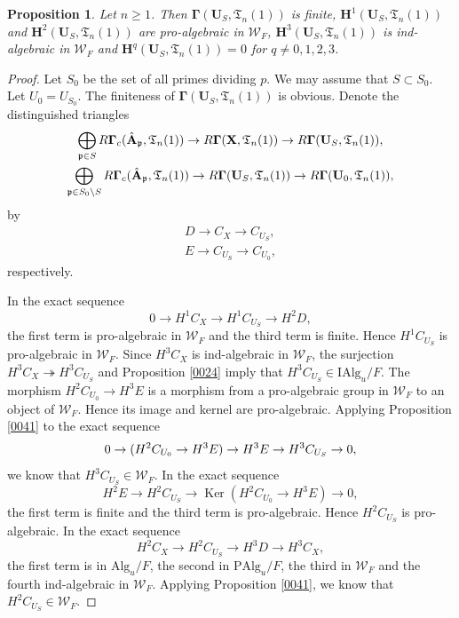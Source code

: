 \documentclass{amsart}
\newtheorem{Prop}[Thm]{Proposition}
\theoremstyle{remark}
\numberwithin{equation}{section}
\newcommand{\onto}{\twoheadrightarrow}
\newcommand{\Alg}{\mathrm{Alg}}
\newcommand{\Ind}{\mathrm{I}}
\newcommand{\Pro}{\mathrm{P}}
\newcommand{\alg}[1]{\mathbf{#1}}
\newcommand{\ideal}[1]{\mathfrak{#1}}
\DeclareMathOperator{\Ker}{Ker}
\let\Im\relax
\DeclareMathOperator{\Im}{Im}
\begin{document}
\begin{Prop} \label{0052}
	Let $n \ge 1$.
	Then $\alg{\Gamma}(\alg{U}_{S}, \mathfrak{T}_{n}(1))$ is finite,
	$\alg{H}^{1}(\alg{U}_{S}, \mathfrak{T}_{n}(1))$ and
	$\alg{H}^{2}(\alg{U}_{S}, \mathfrak{T}_{n}(1))$ are pro-algebraic in $\mathcal{W}_{F}$,
	$\alg{H}^{3}(\alg{U}_{S}, \mathfrak{T}_{n}(1))$ is ind-algebraic in $\mathcal{W}_{F}$ and
	$\alg{H}^{q}(\alg{U}_{S}, \mathfrak{T}_{n}(1)) = 0$ for $q \ne 0, 1, 2, 3$.
\end{Prop}

\begin{proof}
	Let $S_{0}$ be the set of all primes dividing $p$.
	We may assume that $S \subset S_{0}$.
	Let $U_{0} = U_{S_{0}}$.
	The finiteness of $\alg{\Gamma}(\alg{U}_{S}, \mathfrak{T}_{n}(1))$ is obvious.
	Denote the distinguished triangles
		\begin{gather*}
					\bigoplus_{\ideal{p} \in S}
						R \alg{\Gamma}_{c}(\Hat{\alg{A}}_{\ideal{p}}, \mathfrak{T}_{n}(1))
				\to
					R \alg{\Gamma}(\alg{X}, \mathfrak{T}_{n}(1))
				\to
					R \alg{\Gamma}(\alg{U}_{S}, \mathfrak{T}_{n}(1)),
			\\
					\bigoplus_{\ideal{p} \in S_{0} \setminus S}
						R \alg{\Gamma}_{c}(\Hat{\alg{A}}_{\ideal{p}}, \mathfrak{T}_{n}(1))
				\to
					R \alg{\Gamma}(\alg{U}_{S}, \mathfrak{T}_{n}(1))
				\to
					R \alg{\Gamma}(\alg{U}_{0}, \mathfrak{T}_{n}(1)),
		\end{gather*}
	by
		\begin{gather*}
					D
				\to
					C_{X}
				\to
					C_{U_{S}},
			\\
					E
				\to
					C_{U_{S}}
				\to
					C_{U_{0}},
		\end{gather*}
	respectively.
	
	In the exact sequence
		\[
				0
			\to
				H^{1} C_{X}
			\to
				H^{1} C_{U_{S}}
			\to
				H^{2} D,
		\]
	the first term is pro-algebraic in $\mathcal{W}_{F}$
	and the third term is finite.
	Hence $H^{1} C_{U_{S}}$ is pro-algebraic in $\mathcal{W}_{F}$.
	Since $H^{3} C_{X}$ is ind-algebraic in $\mathcal{W}_{F}$,
	the surjection $H^{3} C_{X} \onto H^{3} C_{U_{S}}$ and Proposition \ref{0024}
	imply that $H^{3} C_{U_{S}} \in \Ind \Alg_{u} / F$.
	The morphism $H^{2} C_{U_{0}} \to H^{3} E$ is a morphism
	from a pro-algebraic group in $\mathcal{W}_{F}$
	to an object of $\mathcal{W}_{F}$.
	Hence its image and kernel are pro-algebraic.
	Applying Proposition \ref{0041}
	to the exact sequence
		\[
				0
			\to
				\Im(H^{2} C_{U_{0}} \to H^{3} E)
			\to
				H^{3} E
			\to
				H^{3} C_{U_{S}}
			\to
				0,
		\]
	we know that $H^{3} C_{U_{S}} \in \mathcal{W}_{F}$.
	In the exact sequence
		\[
				H^{2} E
			\to
				H^{2} C_{U_{S}}
			\to
				\Ker(H^{2} C_{U_{0}} \to H^{3} E)
			\to
				0,
		\]
	the first term is finite and the third term is pro-algebraic.
	Hence $H^{2} C_{U_{S}}$ is pro-algebraic.
	In the exact sequence
		\[
				H^{2} C_{X}
			\to
				H^{2} C_{U_{S}}
			\to
				H^{3} D
			\to
				H^{3} C_{X},
		\]
	the first term is in $\Alg_{u} / F$,
	the second in $\Pro \Alg_{u} / F$,
	the third in $\mathcal{W}_{F}$
	and the fourth ind-algebraic in $\mathcal{W}_{F}$.
	Applying Proposition \ref{0041},
	we know that $H^{2} C_{U_{S}} \in \mathcal{W}_{F}$.
\end{proof}
\end{document}

